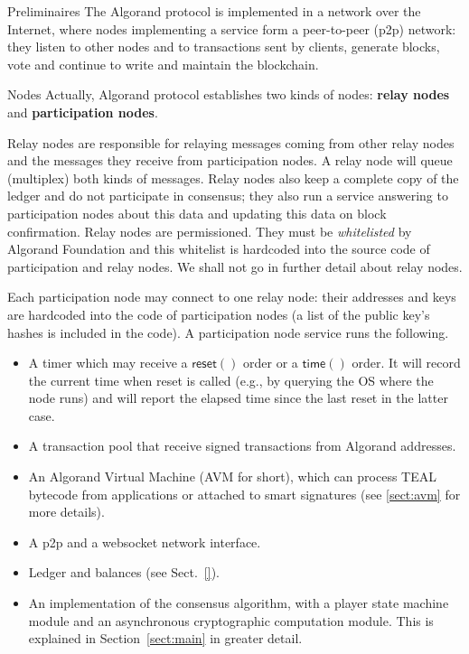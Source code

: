 \documentclass[10pt,a4paper]{article}
\begin{document}
\begin{section}{Preliminaires}
The Algorand protocol is implemented in a network over the Internet, where nodes 
implementing a service form a peer-to-peer (p2p) network: they listen to other nodes 
and to transactions sent by clients, generate blocks, vote and continue to 
write and maintain the blockchain.

\begin{subsection}{Nodes}
Actually, Algorand protocol establishes two kinds of nodes: 
{\bf relay nodes} and {\bf participation nodes}.

Relay nodes are responsible for relaying messages coming from other relay nodes
and the messages they receive from participation nodes. 
A relay node will queue (multiplex) both kinds of messages.
Relay nodes also keep a complete copy of the ledger and 
do not participate in consensus; they also run a service 
answering to participation nodes about this data and 
updating this data on block confirmation.
Relay nodes are permissioned. They must be {\em whitelisted} by 
Algorand Foundation and this whitelist is hardcoded into the source 
code of participation and relay nodes.
We shall not go in further detail about relay nodes.

Each participation node may connect to one relay node: their addresses and keys
are hardcoded into the code of participation nodes (a list of the public key's 
hashes is included in the code).
A participation node service runs the following.
\begin{itemize}
    \item A timer which may receive a $\mathsf{reset()}$ order or a $\mathsf{time()}$
        order. It will record the current time when reset is called (e.g., by querying
        the OS where the node runs) and will report the elapsed time since the last reset
        in the latter case.
    \item A transaction pool that receive signed transactions from Algorand addresses.
    \item An Algorand Virtual Machine (AVM for short), which can process TEAL bytecode
        from applications or attached to smart signatures (see \ref{sect:avm} for more details). 
    \item A p2p and a websocket network interface.
    \item Ledger and balances (see Sect.~\ref{}).
    \item An implementation of the consensus algorithm, with a player state machine module and
        an asynchronous cryptographic computation module. This is explained in Section~\ref{sect:main}
        in greater detail.
\end{itemize}


\end{subsection}
\end{section}
\end{document}
